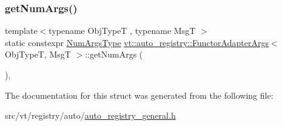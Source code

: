 \mbox{\label{structvt_1_1auto__registry_1_1_functor_adapter_args_3_01_obj_type_t_00_01_msg_t_01_4_a3c47d14a1de80bbc198e55deac7e4176}} 
\subsubsection{\texorpdfstring{get\+Num\+Args()}{getNumArgs()}}
{\footnotesize\ttfamily template$<$typename Obj\+TypeT , typename MsgT $>$ \\
static constexpr \hyperlink{namespacevt_1_1auto__registry_aebda1d9d765bc9147dc654ad0712c936}{Num\+Args\+Type} \hyperlink{structvt_1_1auto__registry_1_1_functor_adapter_args}{vt\+::auto\+\_\+registry\+::\+Functor\+Adapter\+Args}$<$ Obj\+TypeT, MsgT $>$\+::get\+Num\+Args (\begin{DoxyParamCaption}{ }\end{DoxyParamCaption})\hspace{0.3cm}{\ttfamily [inline]}, {\ttfamily [static]}}



The documentation for this struct was generated from the following file\+:\begin{DoxyCompactItemize}
\item 
src/vt/registry/auto/\hyperlink{auto__registry__general_8h}{auto\+\_\+registry\+\_\+general.\+h}\end{DoxyCompactItemize}

